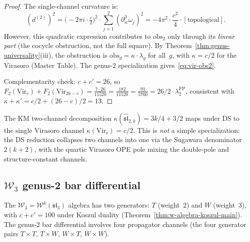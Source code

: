\begin{proof}
The single-channel curvature is:
\[
(d^{(2)})^2 = \bigl(-2\pi i \cdot \tfrac{c}{2}\bigr)^2
\cdot \sum_{j=1}^{2} (\partial_w^3\omega_j)^2
= -4\pi^2 \cdot \frac{c^2}{4} \cdot [\text{topological}].
\]
However, this quadratic expression contributes to
$\mathrm{obs}_2$ only through its \emph{linear part} (the
cocycle obstruction, not the full square).  By
Theorem~\ref{thm:genus-universality}(iii), the obstruction is
$\mathrm{obs}_g = \kappa \cdot \lambda_g$ for all~$g$, with
$\kappa = c/2$ for the Virasoro (Master Table).  The
genus-$2$ specialization gives~\eqref{eq:vir-obs2}.

Complementarity check: $c + c' = 26$, so
$F_2(\mathrm{Vir}_c) + F_2(\mathrm{Vir}_{26-c})
= \frac{7 \cdot 26}{11520} = \frac{182}{11520}
= \frac{91}{5760} = 26/2 \cdot \lambda_2^{\mathrm{FP}}$,
consistent with
$\kappa + \kappa' = c/2 + (26-c)/2 = 13$.
\end{proof}

\begin{remark}
\label{rem:virasoro-genus2-ds}
The KM two-channel decomposition $\kappa(\widehat{\mathfrak{sl}}_{2,k}) = 3k/4 + 3/2$ maps under DS to the single Virasoro channel $\kappa(\mathrm{Vir}_c) = c/2$.  This is \emph{not} a simple specialization: the DS reduction collapses two channels into one via the Sugawara denominator $2(k+2)$, with the quartic Virasoro OPE pole mixing the double-pole and structure-constant channels.
\end{remark}

\subsection{\texorpdfstring{$\mathcal{W}_3$ genus-2 bar differential}{W3 genus-2 bar differential}}
\label{subsec:w3-genus2-bar}

The $\mathcal{W}_3 = \mathcal{W}^k(\mathfrak{sl}_3)$ algebra has
two generators: $T$ (weight~$2$) and $W$ (weight~$3$), with
$c + c' = 100$ under Koszul duality
(Theorem~\ref{thm:w-algebra-koszul-main}).  The genus-$2$ bar
differential involves four propagator channels (the four
generator pairs $T \times T$, $T \times W$, $W \times T$,
$W \times W$).

